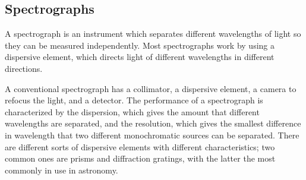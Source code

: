 \documentclass[12pt]{article}
\begin{document}
\subsection*{Spectrographs}
A spectrograph is an instrument which separates different wavelengths
of light so they can be measured independently. Most spectrographs
work by using a dispersive element, which directs light of different
wavelengths in different directions.

A conventional spectrograph has a collimator, a dispersive element, a
camera to refocus the light, and a detector. The performance of a
spectrograph is characterized by the dispersion, which gives the
amount that different wavelengths are separated, and the resolution,
which gives the smallest difference in wavelength that two different
monochromatic sources can be separated. There are different sorts of
dispersive elements with different characteristics; two common ones
are prisms and diffraction gratings, with the latter the most commonly
in use in astronomy.
\end{document}
